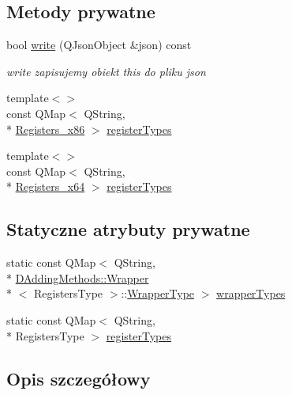 \subsection*{Metody prywatne}
\begin{DoxyCompactItemize}
\item 
bool \hyperlink{class_d_adding_methods_1_1_wrapper_a58262eb13d7aba4be0891d82f5ee0cc2}{write} (Q\-Json\-Object \&json) const 
\begin{DoxyCompactList}\small\item\em write zapisujemy obiekt this do pliku json \end{DoxyCompactList}\item 
{\footnotesize template$<$$>$ }\\const Q\-Map$<$ Q\-String, \\*
\hyperlink{codedefines_8h_a0f84efe4ca4d99203713a78bd6e8c82e}{Registers\-\_\-x86} $>$ \hyperlink{class_d_adding_methods_1_1_wrapper_a23c5ce701c9c72ceeaa1a51a66469d1f}{register\-Types}
\item 
{\footnotesize template$<$$>$ }\\const Q\-Map$<$ Q\-String, \\*
\hyperlink{codedefines_8h_a5e15b5c4d766f6faf29b5bcec37bde5c}{Registers\-\_\-x64} $>$ \hyperlink{class_d_adding_methods_1_1_wrapper_a749f28211834a2f0341ef2c41ea52e4f}{register\-Types}
\end{DoxyCompactItemize}
\subsection*{Statyczne atrybuty prywatne}
\begin{DoxyCompactItemize}
\item 
static const Q\-Map$<$ Q\-String, \\*
\hyperlink{class_d_adding_methods_1_1_wrapper}{D\-Adding\-Methods\-::\-Wrapper}\\*
$<$ Registers\-Type $>$\-::\hyperlink{class_d_adding_methods_1_1_wrapper_acb6db05ae66304ccd8b53c49221e0b09}{Wrapper\-Type} $>$ \hyperlink{class_d_adding_methods_1_1_wrapper_abcab95b43aa54857c51d47c8cb283f7b}{wrapper\-Types}
\item 
static const Q\-Map$<$ Q\-String, \\*
Registers\-Type $>$ \hyperlink{class_d_adding_methods_1_1_wrapper_aa6b67c45d00922b17d7934cdafb98799}{register\-Types}
\end{DoxyCompactItemize}


\subsection{Opis szczegółowy}
